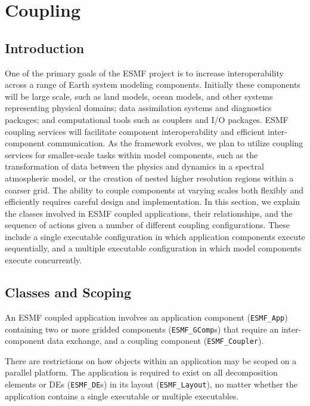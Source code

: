 \section{Coupling}

\subsection{Introduction}

One of the primary goals of the ESMF project is to increase interoperability
across a range of Earth system modeling components.  Initially these 
components will be large scale, such as land models, ocean models, 
and other systems representing physical domains; data assimilation systems
and diagnostics packages; and computational tools such as couplers and 
I/O packages.  ESMF coupling services will facilitate component 
interoperability and efficient inter-component communication.  As the 
framework evolves, we plan to utilize coupling services for smaller-scale 
tasks within model components, such as the transformation of data between the 
physics and dynamics in a spectral atmospheric model, or the creation 
of nested higher resolution regions within a coarser grid.  The ability to 
couple components at varying scales both flexibly and efficiently requires
careful design and implementation.  In this section, we 
explain the classes involved in ESMF coupled applications, their 
relationships, and the sequence of actions given a number of different 
coupling configurations.  These include a single executable configuration in 
which application components execute sequentially, and a multiple executable
configuration in which model components execute concurrently.

\subsection{Classes and Scoping}

An ESMF coupled application involves an application component
({\tt ESMF\_App})
containing two or more gridded components ({\tt ESMF\_GComp}s) that require an 
inter-component data exchange, and a coupling component ({\tt ESMF\_Coupler}).

There are restrictions on how objects within an application may be scoped
on a parallel platform.  The application is required to exist on all 
decomposition elements or DEs ({\tt ESMF\_DE}s) in its layout ({\tt ESMF\_Layout}), 
no matter whether the application contains a single executable or multiple 
executables.

